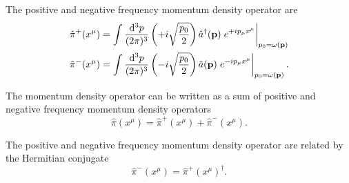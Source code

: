 \begin{definition}
	The positive and negative frequency momentum density operator are
	\begin{align}
		\hat\pi^+(x^\mu)
		&=
		\int\frac{\dd[3]{p}}{(2\pi)^3}
		\left(
			+
			i\sqrt{\frac{p_0}{2}}
		\right)
		\hat{a}^\dagger(\vb{p})
		\eval{e^{+ip_\mu x^\mu}}_{p_0=\omega(\vb{p})}
		\\
		\hat\pi^-(x^\mu)
		&=
		\int\frac{\dd[3]{p}}{(2\pi)^3}
		\left(
			-
			i\sqrt{\frac{p_0}{2}}
		\right)
		\hat{a}(\vb{p})
		\eval{e^{-ip_\mu x^\mu}}_{p_0=\omega(\vb{p})}
		.
	\end{align}
\end{definition}
\begin{corollary}
	The momentum density operator can be written as a sum of positive and negative frequency momentum density operators
	\begin{equation}
		\hat\pi(x^\mu)
		=
		\hat\pi^+(x^\mu)
		+
		\hat\pi^-(x^\mu)
		.
	\end{equation}
\end{corollary}
\begin{corollary}
	The positive and negative frequency momentum density operator are related by the Hermitian conjugate
	\begin{equation}
		\hat\pi^-(x^\mu)
		=
		\hat\pi^+(x^\mu)^\dagger
		.
	\end{equation}	
\end{corollary}


